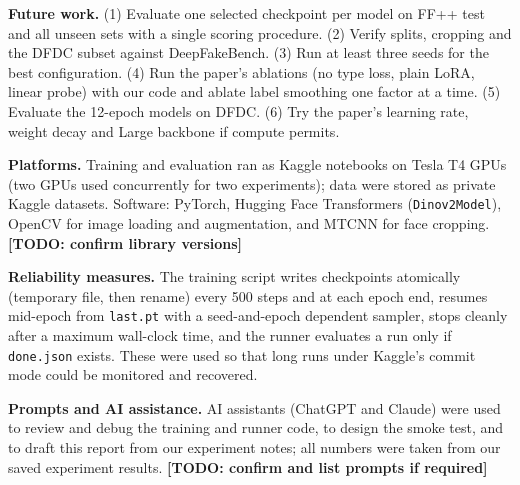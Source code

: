 \documentclass[lettersize,journal]{IEEEtran}
\newcommand{\todo}[1]{\textbf{[TODO: #1]}}
\begin{document}
\textbf{Future work.} (1) Evaluate one selected checkpoint per model on FF++ test and all unseen sets with a single scoring procedure. (2) Verify splits, cropping and the DFDC subset against DeepFakeBench. (3) Run at least three seeds for the best configuration. (4) Run the paper's ablations (no type loss, plain LoRA, linear probe) with our code and ablate label smoothing one factor at a time. (5) Evaluate the 12-epoch models on DFDC. (6) Try the paper's learning rate, weight decay and Large backbone if compute permits.




{\appendix
\textbf{Platforms.} Training and evaluation ran as Kaggle notebooks on Tesla T4 GPUs (two GPUs used concurrently for two experiments); data were stored as private Kaggle datasets. Software: PyTorch, Hugging Face Transformers (\texttt{Dinov2Model}), OpenCV for image loading and augmentation, and MTCNN for face cropping. \todo{confirm library versions}

\textbf{Reliability measures.} The training script writes checkpoints atomically (temporary file, then rename) every 500 steps and at each epoch end, resumes mid-epoch from \texttt{last.pt} with a seed-and-epoch dependent sampler, stops cleanly after a maximum wall-clock time, and the runner evaluates a run only if \texttt{done.json} exists. These were used so that long runs under Kaggle's commit mode could be monitored and recovered.

\textbf{Prompts and AI assistance.} AI assistants (ChatGPT and Claude) were used to review and debug the training and runner code, to design the smoke test, and to draft this report from our experiment notes; all numbers were taken from our saved experiment results. \todo{confirm and list prompts if required}
}
\end{document}
